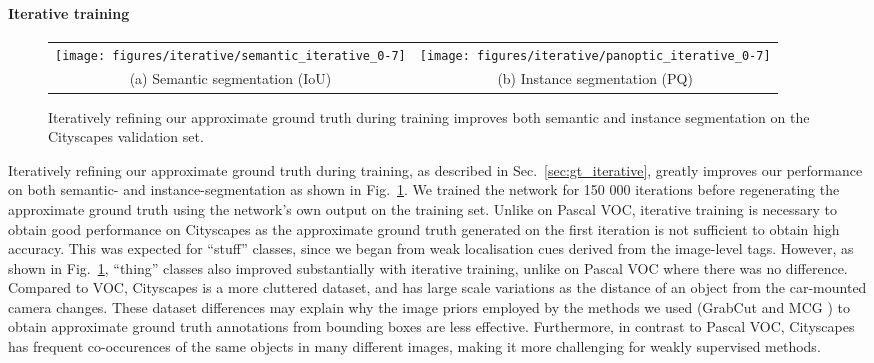 \documentclass[runningheads]{llncs}
\begin{document}
\paragraph{Iterative training}
\begin{figure}[t]
\centering

\begin{tabularx}{\linewidth}{ cc}

\texttt{[image: figures/iterative/semantic\_iterative\_0-7]}
&
\texttt{[image: figures/iterative/panoptic\_iterative\_0-7]}          
\\
(a) Semantic segmentation (IoU) & (b) Instance segmentation (PQ) \\

\end{tabularx}

\setlength{\tabcolsep}{6pt}

\caption{
	Iteratively refining our approximate ground truth during training improves both semantic and instance segmentation on the Cityscapes validation set.}
\label{fig:iterative_training}
\end{figure} Iteratively refining our approximate ground truth during training, as described in Sec.~\ref{sec:gt_iterative}, greatly improves our performance on both semantic- and instance-segmentation as shown in Fig.~\ref{fig:iterative_training}.
We trained the network for 150 000 iterations before regenerating the approximate ground truth using the network's own output on the training set.
Unlike on Pascal VOC, iterative training is necessary to obtain good performance on Cityscapes as the approximate ground truth generated on the first iteration is not sufficient to obtain high accuracy.
This was expected for ``stuff'' classes, since we began from weak localisation cues derived from the image-level tags.
However, as shown in Fig.~\ref{fig:iterative_training}, ``thing'' classes also improved substantially with iterative training, unlike on Pascal VOC where there was no difference.
Compared to VOC, Cityscapes is a more cluttered dataset, and has large scale variations as the distance of an object from the car-mounted camera changes.
These dataset differences may explain why the image priors employed by the methods we used (GrabCut \cite{rother_2004} and MCG \cite{arbelaez_2014}) to obtain approximate ground truth annotations from bounding boxes are less effective.
Furthermore, in contrast to Pascal VOC, Cityscapes has frequent co-occurences of the same objects in many different images, making it more challenging for weakly supervised methods.
\end{document}
